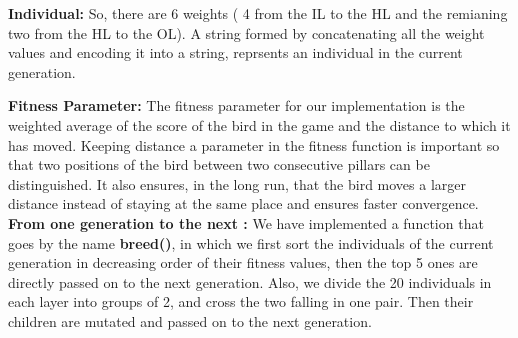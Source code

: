 \documentclass{article}
\begin{document}
\textbf{Individual:} So, there are 6 weights ( 4 from the IL to the HL and the remianing two from the HL to the OL). A string formed by concatenating all the weight values and encoding it into a string, reprsents an individual in the current generation.
\hfill \break
\hfill \break

\textbf{Fitness Parameter: }The fitness parameter for our implementation is the weighted average of the score of the bird in the game and the distance to which it has moved. Keeping distance a parameter in the fitness function is important so that two positions of the bird between two consecutive pillars can be distinguished. It also ensures, in the long run, that the bird moves a larger distance instead of staying at the same place and ensures faster convergence.
\hfill \break
\hfill \break
\textbf{From one generation to the next :} We have implemented a function that goes by the name \textbf{breed()}, in which we first sort the individuals of the current generation in decreasing order of their fitness values, then the top 5 ones are directly passed on to the next generation. Also, we divide the 20 individuals in each layer into groups of 2, and cross the two falling in one pair. Then their children are mutated and passed on to the next generation.  
\end{document}
